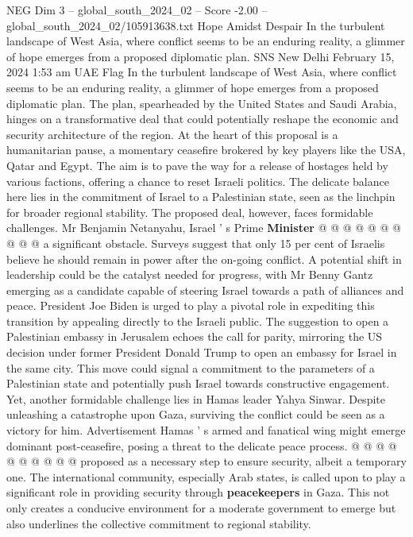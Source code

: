 \begin{textsample}{NEG Dim 3 – global\_south\_2024\_02 – Score -2.00 – global\_south\_2024\_02/105913638.txt}  \label{ex:f3_neg_081}
Hope Amidst Despair In the turbulent landscape of West Asia, where conflict seems to be an enduring reality, a glimmer of hope emerges from a proposed diplomatic plan.
SNS New Delhi February 15, 2024 1:53 am UAE Flag In the turbulent landscape of West Asia, where conflict seems to be an enduring reality, a glimmer of hope emerges from a proposed diplomatic plan.
The plan, spearheaded by the United States and Saudi Arabia, hinges on a transformative deal that could potentially reshape the economic and security architecture of the region.
At the heart of this proposal is a humanitarian pause, a momentary ceasefire brokered by key players like the USA, Qatar and Egypt.
The aim is to pave the way for a release of hostages held by various factions, offering a chance to reset Israeli politics.
The delicate balance here lies in the commitment of Israel to a Palestinian state, seen as the linchpin for broader regional stability.
The proposed deal, however, faces formidable challenges.
Mr Benjamin Netanyahu, Israel ' s Prime \textbf{Minister} @ @ @ @ @ @ @ @ @ @ a significant obstacle.
Surveys suggest that only 15 per cent of Israelis believe he should remain in power after the on-going conflict.
A potential shift in leadership could be the catalyst needed for progress, with Mr Benny Gantz emerging as a candidate capable of steering Israel towards a path of alliances and peace.
President Joe Biden is urged to play a pivotal role in expediting this transition by appealing directly to the Israeli public.
The suggestion to open a Palestinian embassy in Jerusalem echoes the call for parity, mirroring the US decision under former President Donald Trump to open an embassy for Israel in the same city.
This move could signal a commitment to the parameters of a Palestinian state and potentially push Israel towards constructive engagement.
Yet, another formidable challenge lies in Hamas leader Yahya Sinwar.
Despite unleashing a catastrophe upon Gaza, surviving the conflict could be seen as a victory for him.
Advertisement Hamas ' s armed and fanatical wing might emerge dominant post-ceasefire, posing a threat to the delicate peace process. @ @ @ @ @ @ @ @ @ @ proposed as a necessary step to ensure security, albeit a temporary one.
The international community, especially Arab states, is called upon to play a significant role in providing security through \textbf{peacekeepers} in Gaza.
This not only creates a conducive environment for a moderate government to emerge but also underlines the collective commitment to regional stability.

\end{textsample}
